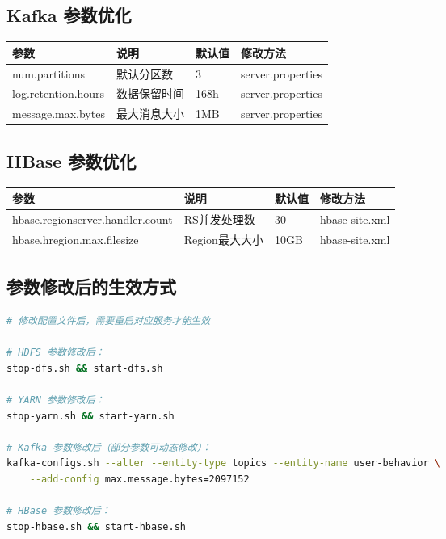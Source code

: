 \documentclass[12pt,a4paper]{article}
\begin{document}
\subsection{Kafka 参数优化}

{\footnotesize
\begin{table}[H]
\centering
\begin{tabular}{llll}
\toprule
\textbf{参数} & \textbf{说明} & \textbf{默认值} & \textbf{修改方法} \\
\midrule
num.partitions & 默认分区数 & 3 & server.properties \\
log.retention.hours & 数据保留时间 & 168h & server.properties \\
message.max.bytes & 最大消息大小 & 1MB & server.properties \\
\bottomrule
\end{tabular}
\end{table}
}

\subsection{HBase 参数优化}

{\footnotesize
\begin{table}[H]
\centering
\begin{tabular}{llll}
\toprule
\textbf{参数} & \textbf{说明} & \textbf{默认值} & \textbf{修改方法} \\
\midrule
hbase.regionserver.handler.count & RS并发处理数 & 30 & hbase-site.xml \\
hbase.hregion.max.filesize & Region最大大小 & 10GB & hbase-site.xml \\
\bottomrule
\end{tabular}
\end{table}
}

\subsection{参数修改后的生效方式}

\begin{lstlisting}[language=bash]
# 修改配置文件后，需要重启对应服务才能生效

# HDFS 参数修改后：
stop-dfs.sh && start-dfs.sh

# YARN 参数修改后：
stop-yarn.sh && start-yarn.sh

# Kafka 参数修改后（部分参数可动态修改）：
kafka-configs.sh --alter --entity-type topics --entity-name user-behavior \
    --add-config max.message.bytes=2097152

# HBase 参数修改后：
stop-hbase.sh && start-hbase.sh
\end{lstlisting}
\end{document}
